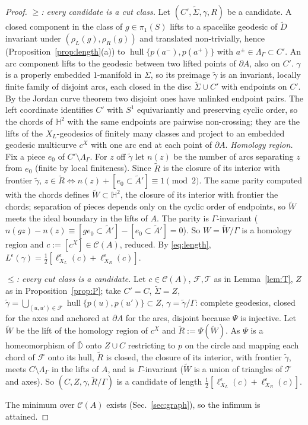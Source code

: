 \documentclass[aps,prd,onecolumn,superscriptaddress,nofootinbib,amsmath,amssymb,11pt]{revtex4-2}
\theoremstyle{definition}
\newcommand{\Hyp}{\mathbb{H}^2}
\newcommand{\Cut}{\mathcal{C}}
\newcommand{\eps}{\epsilon}
\newcommand{\Dt}{\tilde D}
\newcommand{\hull}{\operatorname{hull}}
\begin{document}
\begin{proof}
\emph{$\ge$: every candidate is a cut class.} Let $(C',\tilde\Sigma,\gamma,R)$ be a candidate. A closed component in the class of
$g\in\pi_1(S)$ lifts to a spacelike geodesic of $\Dt$ invariant under $(\rho_L(g),\rho_R(g))$ and translated non-trivially, hence
(Proposition~\ref{prop:length}(a)) to $\hull\{p(a^-),p(a^+)\}$ with $a^\pm\in\Lambda_\Gamma\subset C'$. An arc component lifts to
the geodesic between two lifted points of $\partial A$, also on $C'$. $\gamma$ is a properly embedded $1$-manifold in $\Sigma$, so
its preimage $\tilde\gamma$ is an invariant, locally finite family of disjoint arcs, each closed in the disc $\tilde\Sigma\cup C'$ with
endpoints on $C'$. By the Jordan curve theorem two disjoint ones have unlinked endpoint pairs. The left coordinate identifies
$C'$ with $S^1$ equivariantly and preserving cyclic order, so the chords of $\Hyp$ with the same endpoints are pairwise
non-crossing; they are the lifts of the $X_L$-geodesics of finitely many classes and project to an embedded geodesic
multicurve $c^X$ with one arc end at each point of $\partial A$.
\emph{Homology region.} Fix a piece $e_0$ of $C'\setminus\Lambda_\Gamma$. For $z$ off $\tilde\gamma$ let $n(z)$ be the number of arcs
separating $z$ from $e_0$ (finite by local finiteness). Since $\tilde R$ is the closure of its interior with frontier $\tilde\gamma$,
$z\in\tilde R\Leftrightarrow n(z)+[e_0\subset\tilde A']\equiv1\pmod2$. The same parity computed with the chords defines
$\tilde W\subset\Hyp$, the closure of its interior with frontier the chords; separation of pieces depends only on the cyclic order
of endpoints, so $\tilde W$ meets the ideal boundary in the lifts of $A$. The parity is $\Gamma$-invariant ($n(gz)-n(z)\equiv
[ge_0\subset\tilde A']-[e_0\subset\tilde A']=0$). So $W=\tilde W/\Gamma$ is a homology region and $c:=[c^X]\in\Cut(A)$, reduced. By
\eqref{eq:length}, $L^\eps(\gamma)=\frac12[\ell^\eps_{X_L}(c)+\ell^\eps_{X_R}(c)]$.

\emph{$\le$: every cut class is a candidate.} Let $c\in\Cut(A)$, $\mathcal F,\mathcal T$ as in Lemma~\ref{lem:T}, $Z$ as in
Proposition~\ref{prop:P}; take $C'=C$, $\tilde\Sigma=Z$, $\tilde\gamma=\bigcup_{(u,u')\in\mathcal F}\hull\{p(u),p(u')\}\subset Z$,
$\gamma=\tilde\gamma/\Gamma$: complete geodesics, closed for the axes and anchored at $\partial A$ for the arcs, disjoint because $\Psi$
is injective. Let $\tilde W$ be the lift of the homology region of $c^X$ and $\tilde R:=\Psi(\tilde W)$. As $\Psi$ is a homeomorphism of
$\bar{\mathbb D}$ onto $Z\cup C$ restricting to $p$ on the circle and mapping each chord of $\mathcal F$ onto its hull, $\tilde R$ is
closed, the closure of its interior, with frontier $\tilde\gamma$, meets $C\setminus\Lambda_\Gamma$ in the lifts of $A$, and is
$\Gamma$-invariant ($\tilde W$ is a union of triangles of $\mathcal T$ and axes). So $(C,Z,\gamma,\tilde R/\Gamma)$ is a candidate of
length $\frac12[\ell^\eps_{X_L}(c)+\ell^\eps_{X_R}(c)]$.

The minimum over $\Cut(A)$ exists (Sec.~\ref{sec:graph}), so the infimum is attained.
\end{proof}
\end{document}
